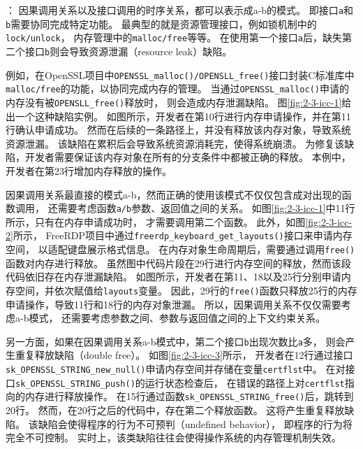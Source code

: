：
因果调用关系以及接口调用的时序关系，都可以表示成a-b的模式。
即接口\texttt{a}和\texttt{b}需要协同完成特定功能。
最典型的就是资源管理接口，例如锁机制中的\texttt{lock/unlock}，
内存管理中的\texttt{malloc/free}等等。
在使用第一个接口\texttt{a}后，缺失第二个接口\texttt{b}则会导致资源泄漏（resource leak）缺陷。



例如，在OpenSSL项目中\texttt{OPENSSL\_malloc()/OPENSLL\_free()}接口封装C标准库中
\texttt{malloc/free}的功能，以协同完成内存的管理。
当通过\texttt{OPENSSL\_malloc()}申请的内存没有被\texttt{OPENSLL\_free()}释放时，
则会造成内存泄漏缺陷。
图\ref{fig:2-3-icc-1}给出一个这种缺陷实例。
如图所示，开发者在第10行进行内存申请操作，并在第11行确认申请成功。
然而在后续的一条路径上，并没有释放该内存对象，导致系统资源泄漏。
该缺陷在累积后会导致系统资源消耗完，使得系统崩溃。
为修复该缺陷，开发者需要保证该内存对象在所有的分支条件中都被正确的释放。
本例中，开发者在第23行增加内存释放的操作。



因果调用关系最直接的模式a-b，然而正确的使用该模式不仅仅包含成对出现的函数调用，
还需要考虑函数\texttt{a/b}参数、返回值之间的关系。
如图\ref{fig:2-3-icc-1}中11行所示，只有在内存申请成功时，
才需要调用第二个函数。
此外，如图\ref{fig:2-3-icc-2}所示，
FreeRDP项目中通过\texttt{freerdp\_keyboard\_get\_layouts()}接口来申请内存空间，
以适配键盘展示格式信息。
在内存对象生命周期后，需要通过调用\texttt{free()}函数对内存进行释放。
虽然图中代码片段在29行进行内存空间的释放，然而该段代码依旧存在内存泄漏缺陷。
如图所示，开发者在第11、18以及25行分别申请内存空间，并依次赋值给\texttt{layouts}变量。
因此，29行的\texttt{free()}函数只释放25行的内存申请操作，导致11行和18行的内存对象泄漏。
所以，因果调用关系不仅仅需要考虑a-b模式，
还需要考虑参数之间、参数与返回值之间的上下文约束关系。

另一方面，如果在因果调用关系a-b模式中，第二个接口\texttt{b}出现次数比\texttt{a}多，
则会产生重复释放缺陷（double free）。
如图\ref{fig:2-3-icc-3}所示，
开发者在12行通过接口\texttt{sk\_OPENSSL\_STRING\_new\_null()}申请内存空间并存储在变量\texttt{certflst}中。
在对接口\texttt{sk\_OPENSSL\_STRING\_push()}的运行状态检查后，
在错误的路径上对\texttt{certflst}指向的内存进行释放操作。
在15行通过函数\texttt{sk\_OPENSSL\_STRING\_free()}后，跳转到20行。
然而，在20行之后的代码中，存在第二个释放函数。
这将产生重复释放缺陷。
该缺陷会使得程序的行为不可预判（undefined behavior），
即程序的行为将完全不可控制。
实时上，该类缺陷往往会使得操作系统的内存管理机制失效。


